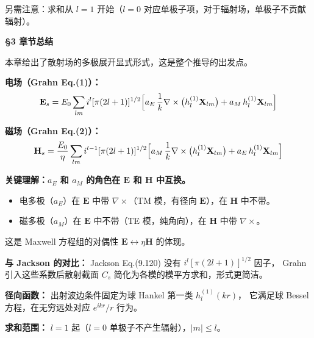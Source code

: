 另需注意：求和从 $l=1$ 开始（$l=0$ 对应单极子项，对于辐射场，单极子不贡献辐射）。

\begin{chaptersummary}

\textbf{§3 章节总结}

本章给出了散射场的多极展开显式形式，这是整个推导的出发点。

\textbf{电场（Grahn Eq.(1)）：}
$$
\mathbf{E}_s = E_0\sum_{lm} i^l[\pi(2l+1)]^{1/2}
\Bigl[a_E\,\frac{1}{k}\nabla\times\bigl(h_l^{(1)}\mathbf{X}_{lm}\bigr)
+ a_M\,h_l^{(1)}\mathbf{X}_{lm}\Bigr]
$$

\textbf{磁场（Grahn Eq.(2)）：}
$$
\mathbf{H}_s = \frac{E_0}{\eta}\sum_{lm} i^{l-1}[\pi(2l+1)]^{1/2}
\Bigl[a_M\,\frac{1}{k}\nabla\times\bigl(h_l^{(1)}\mathbf{X}_{lm}\bigr)
+ a_E\,h_l^{(1)}\mathbf{X}_{lm}\Bigr]
$$

\textbf{关键理解：$a_E$ 和 $a_M$ 的角色在 $\mathbf{E}$ 和 $\mathbf{H}$ 中互换。}
\begin{itemize}
  \item 电多极（$a_E$）在 $\mathbf{E}$ 中带 $\nabla\times$（TM 模，有径向 $\mathbf{E}$），在 $\mathbf{H}$ 中不带。
  \item 磁多极（$a_M$）在 $\mathbf{E}$ 中不带（TE 模，纯角向），在 $\mathbf{H}$ 中带 $\nabla\times$。
\end{itemize}
这是 Maxwell 方程组的对偶性 $\mathbf{E}\leftrightarrow\eta\mathbf{H}$ 的体现。

\textbf{与 Jackson 的对比：} Jackson Eq.(9.120) 没有 $i^l[\pi(2l+1)]^{1/2}$ 因子，
Grahn 引入这些系数后散射截面 $C_s$ 简化为各模的模平方求和，形式更简洁。

\textbf{径向函数：} 出射波边条件固定为球 Hankel 第一类 $h_l^{(1)}(kr)$，
它满足球 Bessel 方程，在无穷远处对应 $e^{ikr}/r$ 行为。

\textbf{求和范围：} $l=1$ 起（$l=0$ 单极子不产生辐射），$|m|\le l$。

\end{chaptersummary}

\newpage

